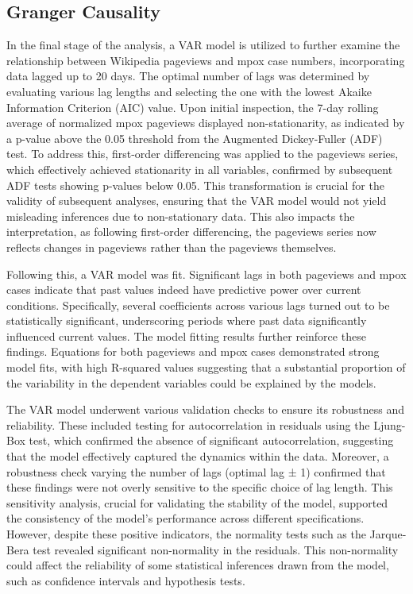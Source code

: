 \documentclass[
  12pt,
]{article}
\begin{document}
\subsection{Granger Causality}\label{granger-causality-1}

In the final stage of the analysis, a VAR model is utilized to further
examine the relationship between Wikipedia pageviews and mpox case
numbers, incorporating data lagged up to 20 days. The optimal number of
lags was determined by evaluating various lag lengths and selecting the
one with the lowest Akaike Information Criterion (AIC) value. Upon
initial inspection, the 7-day rolling average of normalized mpox
pageviews displayed non-stationarity, as indicated by a p-value above
the 0.05 threshold from the Augmented Dickey-Fuller (ADF) test. To
address this, first-order differencing was applied to the pageviews
series, which effectively achieved stationarity in all variables,
confirmed by subsequent ADF tests showing p-values below 0.05. This
transformation is crucial for the validity of subsequent analyses,
ensuring that the VAR model would not yield misleading inferences due to
non-stationary data. This also impacts the interpretation, as following
first-order differencing, the pageviews series now reflects changes in
pageviews rather than the pageviews themselves.

Following this, a VAR model was fit. Significant lags in both pageviews
and mpox cases indicate that past values indeed have predictive power
over current conditions. Specifically, several coefficients across
various lags turned out to be statistically significant, underscoring
periods where past data significantly influenced current values. The
model fitting results further reinforce these findings. Equations for
both pageviews and mpox cases demonstrated strong model fits, with high
R-squared values suggesting that a substantial proportion of the
variability in the dependent variables could be explained by the models.

The VAR model underwent various validation checks to ensure its
robustness and reliability. These included testing for autocorrelation
in residuals using the Ljung-Box test, which confirmed the absence of
significant autocorrelation, suggesting that the model effectively
captured the dynamics within the data. Moreover, a robustness check
varying the number of lags (optimal lag ± 1) confirmed that these
findings were not overly sensitive to the specific choice of lag length.
This sensitivity analysis, crucial for validating the stability of the
model, supported the consistency of the model's performance across
different specifications. However, despite these positive indicators,
the normality tests such as the Jarque-Bera test revealed significant
non-normality in the residuals. This non-normality could affect the
reliability of some statistical inferences drawn from the model, such as
confidence intervals and hypothesis tests.~
\end{document}
